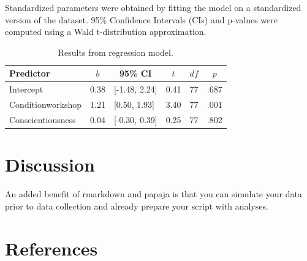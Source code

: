 \documentclass[
  man]{apa6}
\begin{document}
Standardized parameters were obtained by fitting the model on a standardized
version of the dataset. 95\% Confidence Intervals (CIs) and p-values were
computed using a Wald t-distribution approximation.

\begin{table}[tbp]

\begin{center}
\begin{threeparttable}

\caption{\label{tab:regression-table}Results from regression model.}

\begin{tabular}{llllll}
\toprule
Predictor & \multicolumn{1}{c}{$b$} & \multicolumn{1}{c}{95\% CI} & \multicolumn{1}{c}{$t$} & \multicolumn{1}{c}{$\mathit{df}$} & \multicolumn{1}{c}{$p$}\\
\midrule
Intercept & 0.38 & {}[-1.48, 2.24] & 0.41 & 77 & .687\\
Conditionworkshop & 1.21 & {}[0.50, 1.93] & 3.40 & 77 & .001\\
Conscientiousness & 0.04 & {}[-0.30, 0.39] & 0.25 & 77 & .802\\
\bottomrule
\end{tabular}

\end{threeparttable}
\end{center}

\end{table}

\hypertarget{discussion}{%
\section{Discussion}\label{discussion}}

An added benefit of rmarkdown and papaja is that you can simulate your data prior to data collection and already prepare your script with analyses.

\newpage

\hypertarget{references}{%
\section{References}\label{references}}

\begingroup
\setlength{\parindent}{-0.5in}
\setlength{\leftskip}{0.5in}
\end{document}
